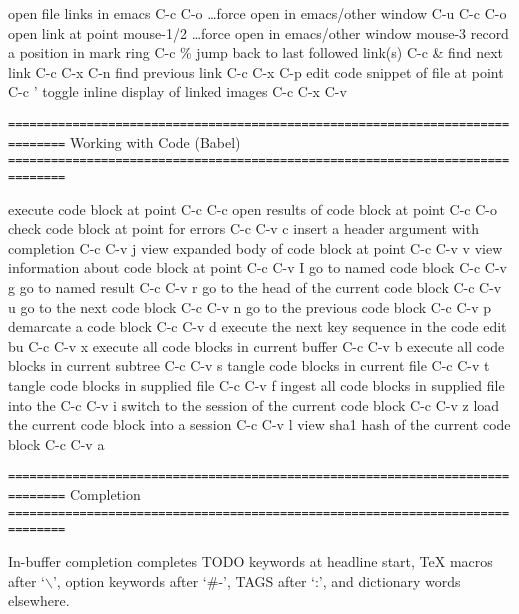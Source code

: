 \documentclass[10pt,a4paper]{article}
\begin{document}
open file links in emacs                          C-c C-o
\ldots{}force open in emacs/other window               C-u C-c C-o
open link at point                                mouse-1/2
\ldots{}force open in emacs/other window               mouse-3
record a position in mark ring                    C-c \%
jump back to last followed link(s)                C-c \&
find next link                                    C-c C-x C-n
find previous link                                C-c C-x C-p
edit code snippet of file at point                C-c '
toggle inline display of linked images            C-c C-x C-v

\texttt{==============================================================================}
Working with Code (Babel)
\texttt{==============================================================================}

execute code block at point                       C-c C-c
open results of code block at point               C-c C-o
check code block at point for errors              C-c C-v c
insert a header argument with completion          C-c C-v j
view expanded body of code block at point         C-c C-v v
view information about code block at point        C-c C-v I
go to named code block                            C-c C-v g
go to named result                                C-c C-v r
go to the head of the current code block          C-c C-v u
go to the next code block                         C-c C-v n
go to the previous code block                     C-c C-v p
demarcate a code block                            C-c C-v d
execute the next key sequence in the code edit bu C-c C-v x
execute all code blocks in current buffer         C-c C-v b
execute all code blocks in current subtree        C-c C-v s
tangle code blocks in current file                C-c C-v t
tangle code blocks in supplied file               C-c C-v f
ingest all code blocks in supplied file into the  C-c C-v i
switch to the session of the current code block   C-c C-v z
load the current code block into a session        C-c C-v l
view sha1 hash of the current code block          C-c C-v a

\texttt{==============================================================================}
Completion
\texttt{==============================================================================}

In-buffer completion completes TODO keywords at headline start, \TeX{}
macros after `$\backslash$', option keywords after `\#-', TAGS
after  `:', and dictionary words elsewhere.
\end{document}
